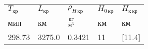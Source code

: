 \begin{tabular}{lllll}
$T_{кр}$ & $L_{кр}$ & $\rho_{H\, кр}$ & $H_{0\, кр}$ & $H_{к\, кр}$ \\
мин & км & $\frac{кг}{м^3}$ & км & км \\
298.73 & 3275.0 & 0.3421 & 11 & [11.4] \\
\end{tabular}
